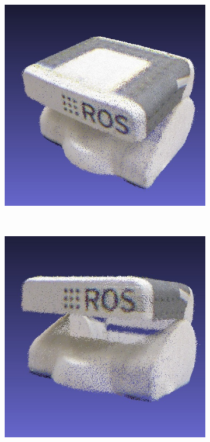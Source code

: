 \documentclass[letterpaper, 10 pt, conference]{ieeeconf}  %
\begin{document}
\begin{figure}[t]
	\centering
        \begin{subfigure}[b]{0.45\linewidth}
                \centering
                \includegraphics[width=\linewidth]{../models/pr2_full.jpg}
                \caption{}
        \end{subfigure}%
        ~ %
        \begin{subfigure}[b]{0.45\linewidth}
                \centering
                \includegraphics[width=\linewidth]{../models/pr2_holes.jpg}

\end{subfigure}
\end{figure}
\end{document}
